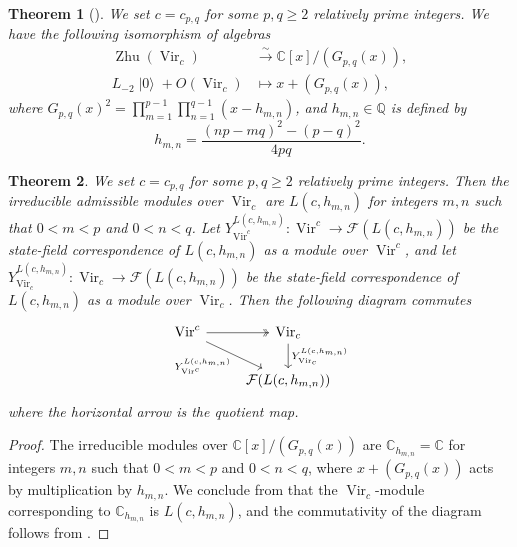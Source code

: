 \documentclass[a4paper, 12pt, reqno]{amsart}
\newtheorem{theorem}{Theorem}[section]
\theoremstyle{remark}
\DeclareMathOperator{\Vir}{Vir}
\DeclareMathOperator{\vac}{|0\rangle}
\DeclareMathOperator{\Zhu}{Zhu}
\begin{document}
\begin{theorem}[{\cite{wang_rationality_1993}}]
  \label{thr:43}
  We set $c = c_{p, q}$ for some $p, q \ge 2$ relatively prime integers.
  We have the following isomorphism of algebras
  \begin{align*}
    \Zhu(\Vir_c) &\xrightarrow{\sim} \mathbb{C}[x]/(G_{p, q}(x)), \\
    L_{-2}\vac + O(\Vir_c) &\mapsto x + (G_{p, q}(x)),
  \end{align*}
  where $G_{p ,q}(x)^2 = \prod_{m = 1}^{p - 1}\prod_{n = 1}^{q - 1}(x - h_{m, n})$, and $h_{m, n} \in \mathbb{Q}$ is defined by
  \begin{equation}
    \label{eq:39}
    h_{m, n} = \frac{(np - mq)^2 - (p - q)^2}{4pq}.
  \end{equation}
\end{theorem}

\begin{theorem}
  \label{thr:44}
  We set $c = c_{p, q}$ for some $p, q \ge 2$ relatively prime integers.
  Then the irreducible admissible modules over $\Vir_c$ are $L(c, h_{m, n})$ for integers $m, n$ such that $0 < m < p$ and $0 < n < q$.
  Let $Y^{L(c, h_{m, n})}_{\Vir^c}: \Vir^c \to \mathcal{F}(L(c, h_{m, n}))$ be the state-field correspondence of $L(c, h_{m, n})$ as a module over $\Vir^c$, and let $Y^{L(c, h_{m, n})}_{\Vir_c}: \Vir_c \to \mathcal{F}(L(c, h_{m, n}))$ be the state-field correspondence of $L(c, h_{m, n})$ as a module over $\Vir_c$.
  Then the following diagram commutes
  \begin{equation*}
    \begin{tikzcd}
      \Vir^c \arrow[r, two heads] \arrow[rd, "{Y^{L(c, h_{m, n})}_{\Vir^c}}"'] & {\Vir_c} \arrow[d, "{Y^{L(c, h_{m, n})}_{\Vir_c}}"] \\
      & {\mathcal{F}(L(c, h_{m, n}))}
    \end{tikzcd}
  \end{equation*}
  where the horizontal arrow is the quotient map.
\end{theorem}

\begin{proof}
  The irreducible modules over $\mathbb{C}[x]/(G_{p, q}(x))$ are $\mathbb{C}_{h_{m, n}} = \mathbb{C}$ for integers $m, n$ such that $0 < m < p$ and $0 < n < q$, where $x + (G_{p, q}(x))$ acts by multiplication by $h_{m, n}$.
  We conclude from  that the $\Vir_c$-module corresponding to $\mathbb{C}_{h_{m, n}}$ is $L(c, h_{m, n})$, and the commutativity of the diagram follows from .
\end{proof}
\end{document}
